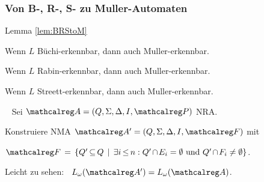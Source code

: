     \begin{frame}[t]
      \frametitle{Von B-, R-, S- zu Muller-Automaten}
      
      \begin{block}{Lemma \ref{lem:BRStoM}}
        \begin{Enumerate}
          \item
          Wenn $L$ Büchi-erkennbar, dann auch Muller-erkennbar.
          \item
          Wenn $L$ Rabin-erkennbar, dann auch Muller-erkennbar.
          \item
          Wenn $L$ Streett-erkennbar, dann auch Muller-erkennbar.
        \end{Enumerate}%
        \label{lem:BRStoM_dummy}%
      \end{block}
      
      \parII
      
      \parI
      ~ Sei $\Amc = (Q,\Sigma,\Delta,I,\Pmc)$ NRA.
      
      \parI
      Konstruiere NMA $\Amc' = (Q,\Sigma,\Delta,I,\Fmc)$ mit
      
      \begin{center}
        $\Fmc \,=\, \{Q' \!\!\:\subseteq\!\!\: Q \,\mid\, \exists i \!\!\:\leq\!\!\: n : Q' \!\!\:\cap\!\!\: E_i = \emptyset \text{~und~} Q' \!\!\:\cap\!\!\: F_i \neq \emptyset\}$.
      \end{center}
      
      Leicht zu sehen:~ $L_\omega(\Amc') = L_\omega(\Amc)$.

      \parII
      
    \end{frame}

